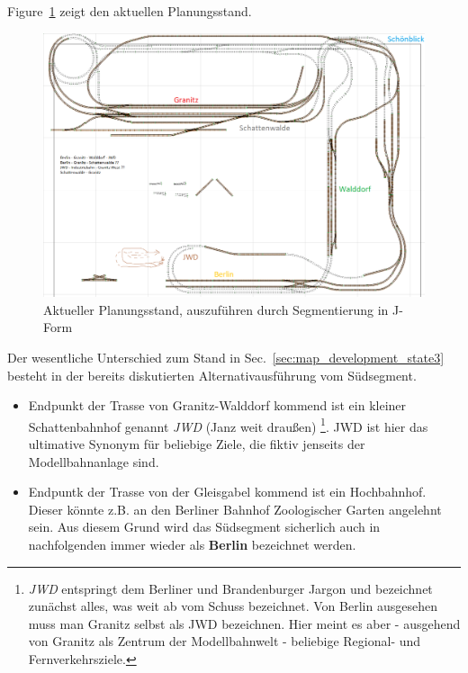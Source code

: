 Figure~\ref{img:stateDate_granitz_modules} zeigt den aktuellen Planungsstand.

\begin{figure}[h]
\centering
  \includegraphics[width=1.0\textwidth]{img/map_evolution/stateDate_granitz_modules.png}
	\caption{Aktueller Planungsstand, auszuf\"uhren durch Segmentierung in J-Form}
	\label{img:stateDate_granitz_modules}
\end{figure}

Der wesentliche Unterschied zum Stand in Sec.~\ref{sec:map_development_state3} besteht in der bereits diskutierten Alternativausf\"uhrung vom S\"udsegment.
\begin{itemize}
	\item Endpunkt der Trasse von Granitz-Walddorf kommend ist ein kleiner Schattenbahnhof genannt \textit{JWD} (Janz weit drau{\ss}en)
	\footnote{\textit{JWD} entspringt dem Berliner und Brandenburger Jargon und bezeichnet zun\"achst alles, was weit ab vom Schuss bezeichnet.
	Von Berlin ausgesehen muss man Granitz selbst als JWD bezeichnen.
	Hier meint es aber - ausgehend von Granitz als Zentrum der Modellbahnwelt - beliebige Regional- und Fernverkehrsziele.}.
	JWD ist hier das ultimative Synonym f\"ur beliebige Ziele, die fiktiv jenseits der Modellbahnanlage sind.
	\item Endpuntk der Trasse von der Gleisgabel kommend ist ein Hochbahnhof.
	Dieser k\"onnte z.B. an den Berliner Bahnhof Zoologischer Garten angelehnt sein.
	Aus diesem Grund wird das S\"udsegment sicherlich auch in nachfolgenden immer wieder als \textbf{Berlin} bezeichnet werden.
\end{itemize}

